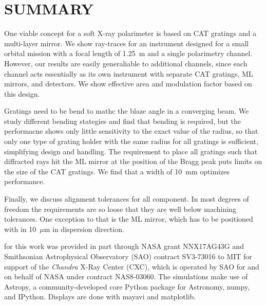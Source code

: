 \documentclass[]{spie}  %
\begin{document}
\section{SUMMARY}
One viable concept for a soft X-ray polarimeter is based on CAT
gratings and a multi-layer mirror. We show ray-traces for an
instrument designed for a small orbital mission with a focal length of
1.25~m and a single polarimetry channel. However, our results are
easily generaliable to additional channels, since each channel acts
essentially as its own instrument with separate CAT gratings, ML
mirrors, and detectors. We show effective area and modulation factor
based on this design.

Gratings need to be bend to mathc the blaze angle in a converging
beam. We study different bending stategies and find that bending is
required, but the performacne shows only little sensitivity to the
exact value of the radius, so that only one type of grating holder
with the same radius for all gratings is sufficient, simplifying
design and handling. The requirement to place all gratings such that
diffracted rays hit the ML mirror at the position of the Bragg peak
puts limits on the size of the CAT gratings. We find that a width of
10~mm optimizes performance.

Finally, we discuss alignment tolerances for all component. In most
degrees of freedom the requirements are so loose that they are well
below machining tolerances. One exception to that is the ML mirror,
which has to be positioned with in 10~$\mu$m in dispersion direction.

\acknowledgments %
for this work was provided in part through NASA grant NNX17AG43G and
Smithsonian Astrophysical Observatory (SAO) contract SV3-73016 to MIT
for support of the {\em Chandra} X-Ray Center (CXC), which is operated
by SAO for and on behalf of NASA under contract NAS8-03060.  The
simulations make use of Astropy, a community-developed core Python
package for Astronomy\cite{astropy1,astropy2}, numpy\cite{numpy}, and
IPython\cite{IPython}. Displays are done with mayavi\cite{mayavi} and
matplotlib\cite{matplotlib}.


\end{document}
